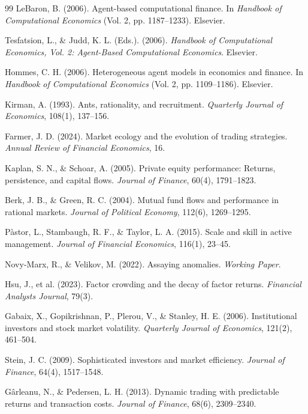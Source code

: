 \begin{thebibliography}{99}
LeBaron, B. (2006). Agent-based computational finance. In \textit{Handbook of Computational Economics} (Vol. 2, pp. 1187--1233). Elsevier.

Tesfatsion, L., \& Judd, K. L. (Eds.). (2006). \textit{Handbook of Computational Economics, Vol. 2: Agent-Based Computational Economics}. Elsevier.

Hommes, C. H. (2006). Heterogeneous agent models in economics and finance. In \textit{Handbook of Computational Economics} (Vol. 2, pp. 1109--1186). Elsevier.

Kirman, A. (1993). Ants, rationality, and recruitment. \textit{Quarterly Journal of Economics}, 108(1), 137--156.

Farmer, J. D. (2024). Market ecology and the evolution of trading strategies. \textit{Annual Review of Financial Economics}, 16.

Kaplan, S. N., \& Schoar, A. (2005). Private equity performance: Returns, persistence, and capital flows. \textit{Journal of Finance}, 60(4), 1791--1823.

Berk, J. B., \& Green, R. C. (2004). Mutual fund flows and performance in rational markets. \textit{Journal of Political Economy}, 112(6), 1269--1295.

P\`{a}stor, L., Stambaugh, R. F., \& Taylor, L. A. (2015). Scale and skill in active management. \textit{Journal of Financial Economics}, 116(1), 23--45.

Novy-Marx, R., \& Velikov, M. (2022). Assaying anomalies. \textit{Working Paper}.

Hsu, J., et al. (2023). Factor crowding and the decay of factor returns. \textit{Financial Analysts Journal}, 79(3).

Gabaix, X., Gopikrishnan, P., Plerou, V., \& Stanley, H. E. (2006). Institutional investors and stock market volatility. \textit{Quarterly Journal of Economics}, 121(2), 461--504.

Stein, J. C. (2009). Sophisticated investors and market efficiency. \textit{Journal of Finance}, 64(4), 1517--1548.

G\^{a}rleanu, N., \& Pedersen, L. H. (2013). Dynamic trading with predictable returns and transaction costs. \textit{Journal of Finance}, 68(6), 2309--2340.


\end{thebibliography}
